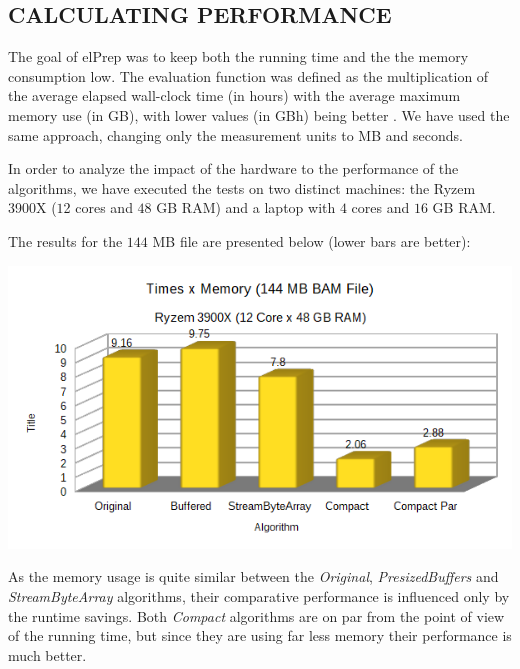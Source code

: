\documentclass[a4paper,twoside]{article}
\begin{document}




 
 
\subsection{\uppercase{Calculating Performance}}
\label{performance}
The goal of elPrep was to keep both the running time and the the memory consumption low. The evaluation function was defined as the multiplication of the average elapsed wall-clock time (in hours) with the average maximum memory use (in GB), with lower values (in GBh) being better \cite{costanza:2019}.
We have used the same approach, changing only the measurement units to MB and seconds.

In order to analyze the impact of the hardware to the performance of the algorithms, we have executed the tests on two distinct machines: the Ryzem 3900X ($1$2 cores and $48$ GB RAM) and a laptop with $4$ cores and $16$ GB RAM.

The results for the $144$ MB file are presented below (lower bars are better):
\begin{center}
	\includegraphics[scale=0.5]{images/times_and_memory_chart_small_144mb_ryzen.png}
\end{center}

As the memory usage is quite similar between the {\it Original}, {\it PresizedBuffers} and {\it StreamByteArray} algorithms, their comparative performance is influenced only by the runtime savings. 
Both {\it Compact} algorithms are on par from the point of view of the running time, but since they are using far less memory their performance is much better.
\end{document}
